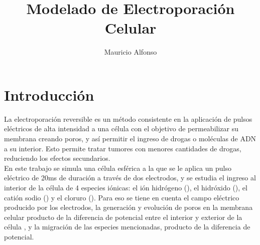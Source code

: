 \documentclass[a4paper,10pt]{article}
\title{Modelado de Electroporación Celular}
\author{Mauricio Alfonso}
\begin{document}
\newcommand{\h}{\ce{H^+}}
\newcommand{\oh}{\ce{OH^-}}
\newcommand{\na}{\ce{Na^+}}
\newcommand{\cl}{\ce{Cl^-}}
\newcommand{\kvm}{$\si{\kilo\volt\per\metre}$}
\newcommand{\usec}{$\si{\micro\second}$}

%

\maketitle

%
%
%

\section{Introducción}

La electroporación reversible es un método consistente en la aplicación de pulsos eléctricos de alta intensidad a una célula con el objetivo de permeabilizar su membrana creando poros, y así permitir el ingreso de drogas o moléculas de ADN a su interior. Esto permite tratar tumores con menores cantidades de drogas, reduciendo los efectos secundarios.\\


En este trabajo se simula una célula esférica a la que se le aplica un pulso eléctrico de 20\si{\milli\second} de duración a través de dos electrodos, y se estudia el ingreso al interior de la célula de 4 especies iónicas: el ión hidrógeno (\h), el hidróxido (\oh), el catión sodio (\na) y el cloruro (\cl). Para eso se tiene en cuenta el campo eléctrico producido por los electrodos, la generación y evolución de poros en la membrana celular producto de la diferencia de potencial entre el interior y exterior de la célula , y la migración de las especies mencionadas, producto de la diferencia de potencial.\\

\end{document}
